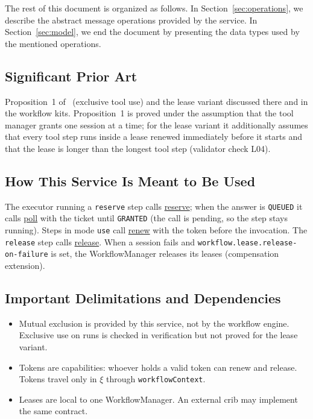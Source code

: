 \documentclass[a4paper]{arrowhead}
\newcommand{\oref}[1]{{\textcolor{ArrowheadBlue}{\hyperref[sec:operations:#1]{#1}}}}
\begin{document}
The rest of this document is organized as follows.
In Section~\ref{sec:operations}, we describe the abstract message operations provided by the service.
In Section~\ref{sec:model}, we end the document by presenting the data types used by the mentioned operations.

\subsection{Significant Prior Art}
Proposition~1 of~\cite{varga2026} (exclusive tool use) and the lease variant discussed there and in
the workflow kits. Proposition~1 is proved under the assumption that the tool manager grants one session at a time; for
the lease variant it additionally assumes that every tool step runs inside a lease renewed immediately before it starts
and that the lease is longer than the longest tool step (validator check L04).

\subsection{How This Service Is Meant to Be Used}
The executor running a \texttt{reserve} step calls \oref{reserve}; when the answer is \texttt{QUEUED} it calls
\oref{poll} with the ticket until \texttt{GRANTED} (the call is pending, so the step stays running). Steps in mode
\texttt{use} call \oref{renew} with the token before the invocation. The \texttt{release} step calls \oref{release}.
When a session fails and \texttt{workflow.\allowbreak{}lease.\allowbreak{}release-\allowbreak{}on-\allowbreak{}failure} is set, the WorkflowManager releases its leases
(compensation extension).

\subsection{Important Delimitations and Dependencies}
\label{sec:delimitations}
\begin{itemize}
\item Mutual exclusion is provided by this service, not by the workflow engine. Exclusive use on runs is checked in verification but not proved for the lease variant.
\item Tokens are capabilities: whoever holds a valid token can renew and release. Tokens travel only in $\xi$ through \texttt{workflow\allowbreak{}Context}.
\item Leases are local to one WorkflowManager. An external crib may implement the same contract.
\end{itemize}
\end{document}
